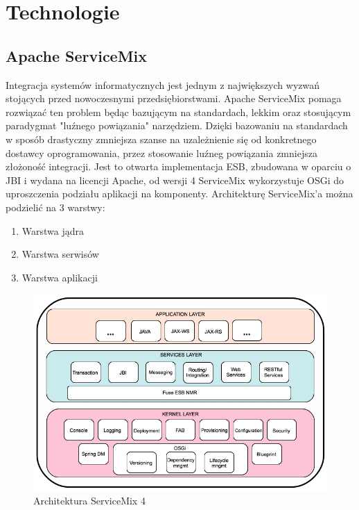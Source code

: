 \ifpdf
    \graphicspath{{3/figures/PNG/}{3/figures/PDF/}{3/figures/}}
\else
    \graphicspath{{3/figures/EPS/}{3/figures/}}
\fi
\chapter{Technologie} %



\section{Apache ServiceMix}
Integracja systemów informatycznych jest jednym z największych wyzwań stojących przed nowoczesnymi przedsiębiorstwami. Apache ServiceMix pomaga rozwiązać ten problem będąc bazującym na standardach, lekkim oraz stosującym paradygmat "luźnego powiązania" narzędziem. Dzięki bazowaniu na standardach w sposób drastyczny zmniejsza szanse na uzależnienie się od konkretnego dostawcy oprogramowania, przez stosowanie luźneg powiązania zmniejsza złożoność integracji. 
Jest to otwarta implementacja ESB, zbudowana w oparciu o JBI i wydana na licencji Apache, od wersji 4 ServiceMix wykorzystuje OSGi do uproszczenia podziału aplikacji na komponenty. 	
Architekturę ServiceMix'a można podzielić na 3 warstwy:
\begin{enumerate}
	\item Warstwa jądra
	\item Warstwa serwisów
	\item Warstwa aplikacji
\end{enumerate}  
\newpage
\begin{figure}[!h]
	\centering
	\includegraphics[scale=0.45]{ServiceMixArchitektura.jpg} 
	\caption{Architektura ServiceMix 4}
\end{figure}
